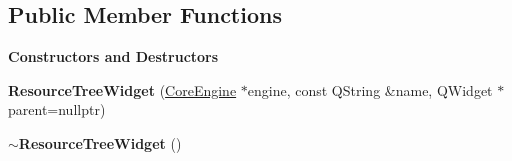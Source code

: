 \subsection*{Public Member Functions}
\begin{Indent}\textbf{ Constructors and Destructors}\par
\begin{DoxyCompactItemize}
\item 
\mbox{\label{classrev_1_1_view_1_1_resource_tree_widget_af61029727eabccd3a7c3e69688ae99b7}} 
{\bfseries Resource\+Tree\+Widget} (\mbox{\hyperlink{classrev_1_1_core_engine}{Core\+Engine}} $\ast$engine, const Q\+String \&name, Q\+Widget $\ast$parent=nullptr)
\item 
\mbox{\label{classrev_1_1_view_1_1_resource_tree_widget_aac37880ff9f438fa42ca943b5af817d5}} 
{\bfseries $\sim$\+Resource\+Tree\+Widget} ()
\end{DoxyCompactItemize}
\end{Indent}
